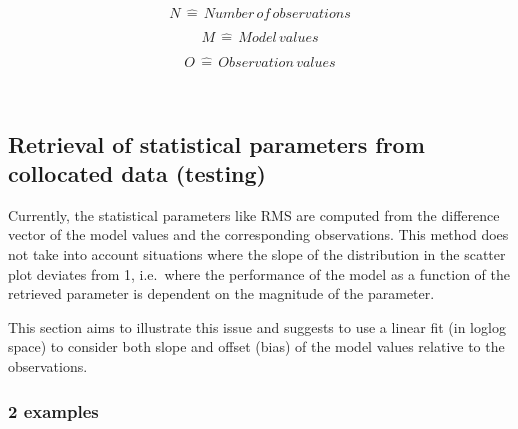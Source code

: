 \documentclass[11pt]{article}
\begin{document}
    
    $$N\,\hat{=}\,Number\,of\,observations$$

    
    $$M\,\hat{=}\,Model\,values$$

    
    $$O\,\hat{=}\,Observation\,values$$

    
    \begin{center}
    \end{center}
    { \hspace*{\fill} \\}
    
    \hypertarget{retrieval-of-statistical-parameters-from-collocated-data-testing}{%
\subsection{Retrieval of statistical parameters from collocated data
(testing)}\label{retrieval-of-statistical-parameters-from-collocated-data-testing}}

Currently, the statistical parameters like RMS are computed from the
difference vector of the model values and the corresponding
observations. This method does not take into account situations where
the slope of the distribution in the scatter plot deviates from 1,
i.e.~where the performance of the model as a function of the retrieved
parameter is dependent on the magnitude of the parameter.

This section aims to illustrate this issue and suggests to use a linear
fit (in loglog space) to consider both slope and offset (bias) of the
model values relative to the observations.

\hypertarget{examples}{%
\subsubsection{2 examples}\label{examples}}
\end{document}
